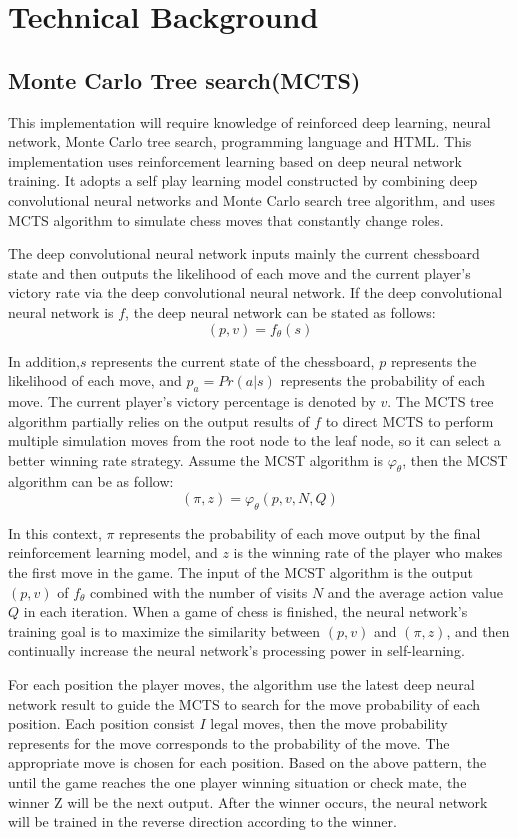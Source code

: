 \documentclass[10pt,twocolumn]{article}
\begin{document}
\section{Technical Background}
\subsection{Monte Carlo Tree search(MCTS)}
	This implementation will require knowledge of reinforced deep learning, neural network, 
	Monte Carlo tree search, programming language and HTML. This implementation uses reinforcement learning based on deep neural network training. It adopts a self play learning model constructed by combining deep convolutional neural networks and Monte Carlo search tree algorithm, and uses MCTS algorithm to simulate chess moves that constantly change roles. 
	
	The deep convolutional neural network inputs mainly the current chessboard state and then outputs the likelihood of each move and the current player's victory rate via the deep convolutional neural network.\cite{MCTSAG} If the deep convolutional neural network is \(f\), the deep neural network can be stated as follows:
	\[(p,v)=f_\theta(s)\]
	
	In addition,\(s\) represents the current state of the chessboard, \(p\) represents the likelihood of each move, and $p_a = Pr (a|s)$ represents the probability of each move. The current player's victory percentage is denoted by \(v\). The MCTS tree algorithm partially relies on the output results of \(f\) to direct MCTS to perform multiple simulation moves from the root node to the leaf node, so it can select a better winning rate strategy. Assume the MCST algorithm is \(\varphi_\theta\), then the MCST algorithm can be as follow:
	\[(\pi,z)=\varphi_\theta(p,v,N,Q)\]\cite{EMCTSXQ}
	
	In this context, \(\pi\) represents the probability of each move output by the final reinforcement learning model, and \(z\) is the winning rate of the player who makes the first move in the game.\cite{Wenzhi} The input of the MCST algorithm is the output \((p,v)\) of \(f_\theta\) combined with the number of visits \(N\) and the average action value \(Q\) in each iteration. When a game of chess is finished, the neural network's training goal is to maximize the similarity between $(p, v)$ and $(\pi, z)$, and then continually increase the neural network's processing power in self-learning.
	
	For each position the player moves, the algorithm use the latest deep neural network result to guide the MCTS to search for the move probability of each position. Each position consist \(I\) legal moves, then the move probability represents for the move corresponds to the probability of the move. The appropriate move is chosen for each position. Based on the above pattern, the until the game reaches the one player winning situation or check mate, the winner Z will be the next output. After the winner occurs, the neural network will be trained in the reverse direction according to the winner.
	
\end{document}
